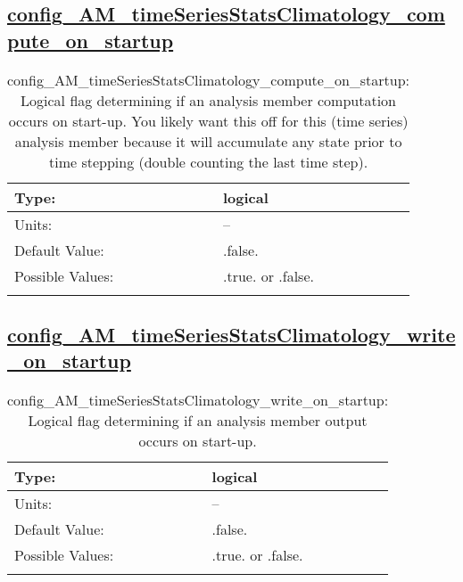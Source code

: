 \subsection[config\_AM\_timeSeriesStatsClimatology\_compute\_on\_startup]{\hyperref[sec:nm_tab_AM_timeSeriesStatsClimatology]{config\_AM\_timeSeriesStatsClimatology\_compute\_on\_startup}}
\label{subsec:nm_sec_config_AM_timeSeriesStatsClimatology_compute_on_startup}
\begin{center}
\begin{longtable}{| p{2.0in} || p{4.0in} |}
    \hline
    Type: & logical \\
    \hline
    Units: & -- \\
    \hline
    Default Value: & .false. \\
    \hline
    Possible Values: & .true. or .false. \\
    \hline
    \caption{config\_AM\_timeSeriesStatsClimatology\_compute\_on\_startup: Logical flag determining if an analysis member computation occurs on start-up. You likely want this off for this (time series) analysis member because it will accumulate any state prior to time stepping (double counting the last time step).}
\end{longtable}
\end{center}
\subsection[config\_AM\_timeSeriesStatsClimatology\_write\_on\_startup]{\hyperref[sec:nm_tab_AM_timeSeriesStatsClimatology]{config\_AM\_timeSeriesStatsClimatology\_write\_on\_startup}}
\label{subsec:nm_sec_config_AM_timeSeriesStatsClimatology_write_on_startup}
\begin{center}
\begin{longtable}{| p{2.0in} || p{4.0in} |}
    \hline
    Type: & logical \\
    \hline
    Units: & -- \\
    \hline
    Default Value: & .false. \\
    \hline
    Possible Values: & .true. or .false. \\
    \hline
    \caption{config\_AM\_timeSeriesStatsClimatology\_write\_on\_startup: Logical flag determining if an analysis member output occurs on start-up.}
\end{longtable}
\end{center}
